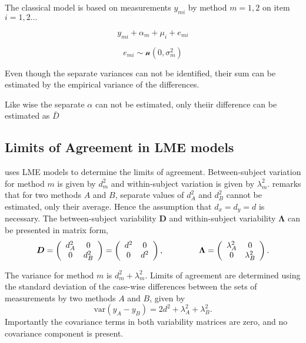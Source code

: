\documentclass[12pt, a4paper]{article}
\theoremstyle{plain}
\theoremstyle{definition}
\theoremstyle{remark}
\begin{document}
	The classical model is based on measurements $y_{mi}$
	by method $m=1,2$ on item $i = 1,2 \ldots$
	
	\[y_{mi} + \alpha_{m} + \mu_{i} + e_{mi}\]
	
	\[e_{mi} \sim \mathcal{n} (0,\sigma^2_m)\]
	
	Even though the separate variances can not be
	identified, their sum can be estimated by the empirical variance of the differences.
	
	Like wise the separate $\alpha$ can not be
	estimated, only theiir difference can be estimated as
	$\bar{D}$
	
	\subsection{Limits of Agreement in LME models}
	\citet{BXC2008} uses LME models to determine the limits of agreement. Between-subject variation for method $m$ is given by $d^2_{m}$ and within-subject variation is given by $\lambda^2_{m}$.  \citet{BXC2008} remarks that for two methods $A$ and $B$, separate values of $d^2_{A}$ and $d^2_{B}$ cannot be estimated, only their average. Hence the assumption that $d_{x}= d_{y}= d$ is necessary. The between-subject variability $\boldsymbol{D}$ and within-subject variability $\boldsymbol{\Lambda}$ can be presented in matrix form,\[
	\boldsymbol{D} = \left(%
	\begin{array}{cc}
	d^2_{A}& 0 \\
	0 & d^2_{B} \\
	\end{array}%
	\right)=\left(%
	\begin{array}{cc}
	d^2& 0 \\
	0 & d^2\\
	\end{array}%
	\right),
	\hspace{1.5cm}
	\boldsymbol{\Lambda} = \left(%
	\begin{array}{cc}
	\lambda^2_{A}& 0 \\
	0 & \lambda^2_{B} \\
	\end{array}%
	\right).
	\]
	
	The variance for method $m$ is $d^2_{m}+\lambda^2_{m}$. Limits of agreement are determined using the standard deviation of the case-wise differences between the sets of measurements by two methods $A$ and $B$, given by
	\begin{equation}
	\mbox{var} (y_{A}-y_{B}) = 2d^2 + \lambda^2_{A}+ \lambda^2_{B}.
	\end{equation}
	Importantly the covariance terms in both variability matrices are zero, and no covariance component is present.
	
\end{document}
